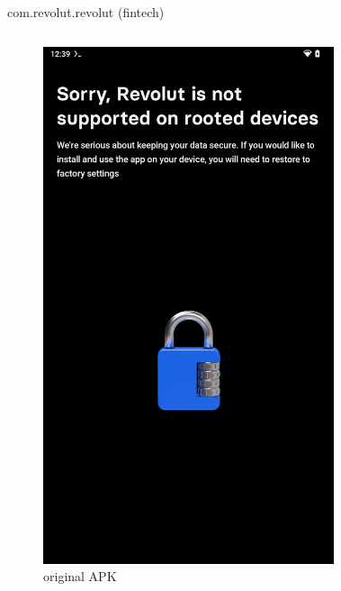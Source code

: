 \documentclass{beamer}
\begin{document}
\begin{frame}[fragile]{com.revolut.revolut (fintech)}

    \begin{columns}
        \begin{figure}
            \centering
            \includegraphics[scale=0.07]{revolut.png}
            \caption{original APK}
        \end{figure}
        \begin{figure}

\end{figure}
\end{columns}
\end{frame}
\end{document}
